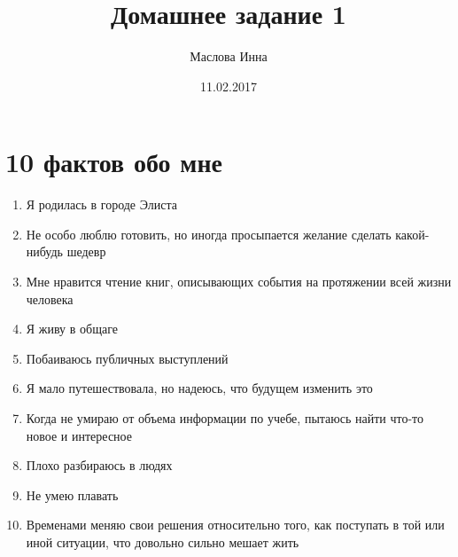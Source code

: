 \documentclass[12pt, a4paper]{article}
\author{Маслова Инна}
\title{Домашнее задание 1}
\date{11.02.2017}
\begin{document}
\maketitle
{}
\section{10 фактов обо мне}
\begin{enumerate}
\item Я родилась в городе Элиста
\item Не особо люблю готовить, но иногда просыпается желание сделать какой-нибудь шедевр
\item Мне нравится чтение книг, описывающих события на протяжении всей жизни человека
\item Я живу в общаге
\item Побаиваюсь публичных выступлений
\item Я мало путешествовала, но надеюсь, что будущем изменить это
\item Когда не умираю от объема информации по учебе, пытаюсь найти что-то новое и интересное
\item Плохо разбираюсь в людях
\item Не умею плавать 
\item Временами меняю свои решения относительно того, как поступать в той или иной ситуации, что довольно сильно мешает жить
\end{enumerate}
\end{document}
